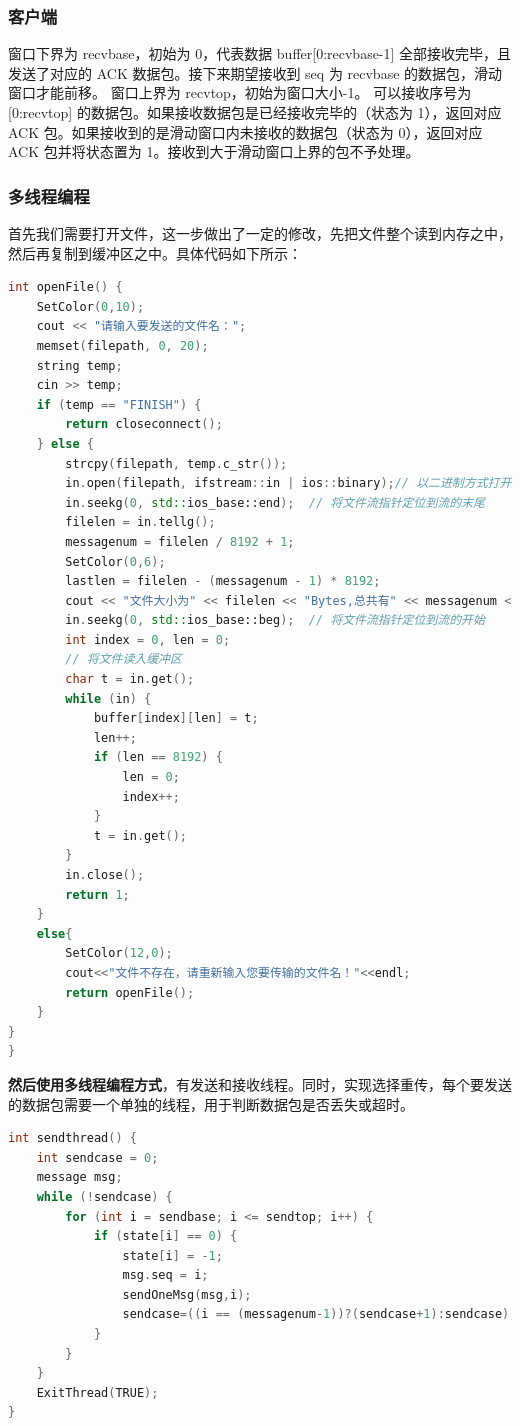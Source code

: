 \documentclass[UTF8,a4paper,10pt]{ctexart}
\begin{document}
\subsubsection{客户端}
窗口下界为 recvbase，初始为 0，代表数据 buffer[0:recvbase-1] 全部接收完毕，且发送了对应的 ACK 数据包。接下来期望接收到 seq 为 recvbase 的数据包，滑动窗口才能前移。
窗口上界为 recvtop，初始为窗口大小-1。
可以接收序号为 [0:recvtop] 的数据包。如果接收数据包是已经接收完毕的（状态为 1），返回对应 ACK 包。如果接收到的是滑动窗口内未接收的数据包（状态为 0），返回对应 ACK 包并将状态置为 1。接收到大于滑动窗口上界的包不予处理。

\subsubsection{多线程编程}
首先我们需要打开文件，这一步做出了一定的修改，先把文件整个读到内存之中，然后再复制到缓冲区之中。具体代码如下所示：
\begin{lstlisting}[title=打开文件,frame=trbl,language={C++}]
int openFile() {
    SetColor(0,10);
    cout << "请输入要发送的文件名：";
    memset(filepath, 0, 20);
    string temp;
    cin >> temp;
    if (temp == "FINISH") {
        return closeconnect();
    } else {
        strcpy(filepath, temp.c_str());
        in.open(filepath, ifstream::in | ios::binary);// 以二进制方式打开文件
        in.seekg(0, std::ios_base::end);  // 将文件流指针定位到流的末尾
        filelen = in.tellg();
        messagenum = filelen / 8192 + 1;
        SetColor(0,6);
        lastlen = filelen - (messagenum - 1) * 8192;
        cout << "文件大小为" << filelen << "Bytes,总共有" << messagenum << "个数据包" << endl;
        in.seekg(0, std::ios_base::beg);  // 将文件流指针定位到流的开始
        int index = 0, len = 0;
        // 将文件读入缓冲区
        char t = in.get();
        while (in) {
            buffer[index][len] = t;
            len++;
            if (len == 8192) {
                len = 0;
                index++;
            }
            t = in.get();
        }
        in.close();
        return 1;
    }
    else{
        SetColor(12,0);
        cout<<"文件不存在，请重新输入您要传输的文件名！"<<endl;
        return openFile();
    }
}
}
\end{lstlisting}
\textbf{然后使用多线程编程方式}，有发送和接收线程。同时，实现选择重传，每个要发送的数据包需要一个单独的线程，用于判断数据包是否丢失或超时。
\begin{lstlisting}[title=发送线程函数,frame=trbl,language={C++}]
int sendthread() {
    int sendcase = 0;
    message msg;
    while (!sendcase) {
        for (int i = sendbase; i <= sendtop; i++) {
            if (state[i] == 0) {
                state[i] = -1;
                msg.seq = i;
                sendOneMsg(msg,i);
                sendcase=((i == (messagenum-1))?(sendcase+1):sendcase);
            }
        }
    }
    ExitThread(TRUE);
}
\end{lstlisting}
\end{document}
